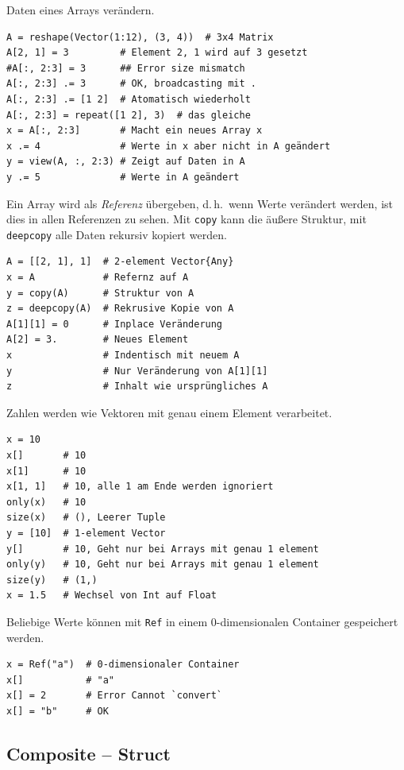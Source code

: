 \documentclass[10pt,twocolumn]{scrartcl}
\begin{document}
Daten eines Arrays verändern.

\begin{lstlisting}
A = reshape(Vector(1:12), (3, 4))  # 3x4 Matrix
A[2, 1] = 3         # Element 2, 1 wird auf 3 gesetzt
#A[:, 2:3] = 3      ## Error size mismatch
A[:, 2:3] .= 3      # OK, broadcasting mit .
A[:, 2:3] .= [1 2]  # Atomatisch wiederholt
A[:, 2:3] = repeat([1 2], 3)  # das gleiche
x = A[:, 2:3]       # Macht ein neues Array x
x .= 4              # Werte in x aber nicht in A geändert
y = view(A, :, 2:3) # Zeigt auf Daten in A
y .= 5              # Werte in A geändert
\end{lstlisting}

Ein Array wird als \emph{Referenz} übergeben, d.\,h.\ wenn Werte verändert
werden, ist dies in allen Referenzen zu sehen. Mit \lstinline|copy| kann die
äußere Struktur, mit \lstinline|deepcopy| alle Daten rekursiv kopiert werden. 

\begin{lstlisting}
A = [[2, 1], 1]  # 2-element Vector{Any}
x = A            # Refernz auf A
y = copy(A)      # Struktur von A
z = deepcopy(A)  # Rekrusive Kopie von A
A[1][1] = 0      # Inplace Veränderung
A[2] = 3.        # Neues Element
x                # Indentisch mit neuem A
y                # Nur Veränderung von A[1][1]
z                # Inhalt wie ursprüngliches A
\end{lstlisting}

Zahlen werden wie Vektoren mit genau einem Element verarbeitet.
\begin{lstlisting}
x = 10
x[]       # 10
x[1]      # 10
x[1, 1]   # 10, alle 1 am Ende werden ignoriert
only(x)   # 10
size(x)   # (), Leerer Tuple
y = [10]  # 1-element Vector
y[]       # 10, Geht nur bei Arrays mit genau 1 element
only(y)   # 10, Geht nur bei Arrays mit genau 1 element
size(y)   # (1,)
x = 1.5   # Wechsel von Int auf Float
\end{lstlisting}

Beliebige Werte können mit \lstinline|Ref| in einem 0-dimensionalen Container gespeichert werden.

\begin{lstlisting}
x = Ref("a")  # 0-dimensionaler Container
x[]           # "a"
x[] = 2       # Error Cannot `convert`
x[] = "b"     # OK
\end{lstlisting}

\subsection{Composite -- Struct}
\label{ssec:composite}
\end{document}
